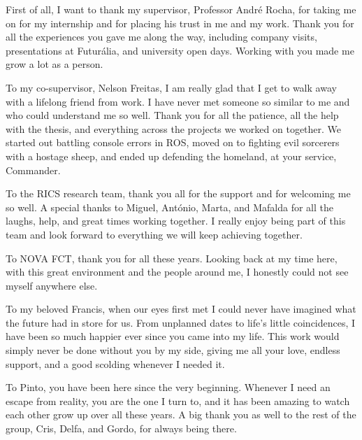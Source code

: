 
%

\begin{ntacknowledgements}

First of all, I want to thank my supervisor, Professor André Rocha, for taking me on for my internship and for placing his trust in me and my work. Thank you for all the experiences you gave me along the way, including company visits, presentations at Futurália, and university open days. Working with you made me grow a lot as a person.

To my co-supervisor, Nelson Freitas, I am really glad that I get to walk away with a lifelong friend from work. I have never met someone so similar to me and who could understand me so well. Thank you for all the patience, all the help with the thesis, and everything across the projects we worked on together. We started out battling console errors in ROS, moved on to fighting evil sorcerers with a hostage sheep, and ended up defending the homeland, at your service, Commander.

To the RICS research team, thank you all for the support and for welcoming me so well. A special thanks to Miguel, António, Marta, and Mafalda for all the laughs, help, and great times working together. I really enjoy being part of this team and look forward to everything we will keep achieving together.

To NOVA FCT, thank you for all these years. Looking back at my time here, with this great environment and the people around me, I honestly could not see myself anywhere else.

To my beloved Francis, when our eyes first met I could never have imagined what the future had in store for us. From unplanned dates to life's little coincidences, I have been so much happier ever since you came into my life. This work would simply never be done without you by my side, giving me all your love, endless support, and a good scolding whenever I needed it.

To Pinto, you have been here since the very beginning. Whenever I need an escape from reality, you are the one I turn to, and it has been amazing to watch each other grow up over all these years. A big thank you as well to the rest of the group, Cris, Delfa, and Gordo, for always being there.


\end{ntacknowledgements}
